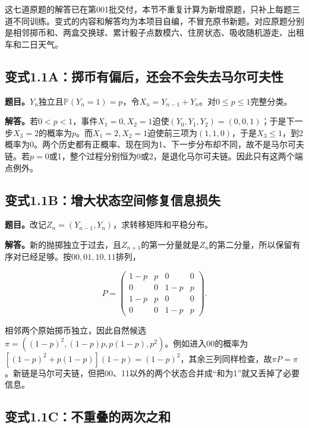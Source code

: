 \documentclass[
  11pt,a4paper,UTF8,fontset=fandol]{ctexart}
\begin{document}
这七道原题的解答已在第001批交付，本节不重复计算为新增原题，只补上每题三道不同训练。变式的内容和解答均为本项目自编，不冒充原书新题。对应原题分别是相邻掷币和、两盒交换球、累计骰子点数模六、住房状态、吸收随机游走、出租车和二日天气。

\subsection{变式1.1A：掷币有偏后，还会不会失去马尔可夫性}\label{ux53d8ux5f0f1.1aux63b7ux5e01ux6709ux504fux540eux8fd8ux4f1aux4e0dux4f1aux5931ux53bbux9a6cux5c14ux53efux592bux6027}

\textbf{题目。}\(Y_n\)独立且\(\mathbb P(Y_n=1)=p\)，令\(X_n=Y_{n-1}+Y_n\)。对\(0\le p\le1\)完整分类。

\textbf{解答。}若\(0<p<1\)，事件\(X_1=0,X_2=1\)迫使\((Y_0,Y_1,Y_2)=(0,0,1)\)；于是下一步\(X_3=2\)的概率为\(p\)。而\(X_1=2,X_2=1\)迫使前三项为\((1,1,0)\)，于是\(X_3\le1\)，到2概率为0。两个历史都有正概率、现在同为1、下一步分布却不同，故不是马尔可夫链。若\(p=0\)或1，整个过程分别恒为0或2，是退化马尔可夫链。因此只有这两个端点例外。

\subsection{变式1.1B：增大状态空间修复信息损失}\label{ux53d8ux5f0f1.1bux589eux5927ux72b6ux6001ux7a7aux95f4ux4feeux590dux4fe1ux606fux635fux5931}

\textbf{题目。}改记\(Z_n=(Y_{n-1},Y_n)\)，求转移矩阵和平稳分布。

\textbf{解答。}新的抛掷独立于过去，且\(Z_{n+1}\)的第一分量就是\(Z_n\)的第二分量，所以保留有序对已经足够。按\(00,01,10,11\)排列，

\[P=\begin{pmatrix}1-p&p&0&0\\0&0&1-p&p\\1-p&p&0&0\\0&0&1-p&p\end{pmatrix}.\]

相邻两个原始掷币独立，因此自然候选\(\pi=((1-p)^2,(1-p)p,p(1-p),p^2)\)。例如进入00的概率为\([(1-p)^2+p(1-p)](1-p)=(1-p)^2\)，其余三列同样检查，故\(\pi P=\pi\)。新链是马尔可夫链，但把00、11以外的两个状态合并成``和为1''就又丢掉了必要信息。

\subsection{变式1.1C：不重叠的两次之和}\label{ux53d8ux5f0f1.1cux4e0dux91cdux53e0ux7684ux4e24ux6b21ux4e4bux548c}
\end{document}
